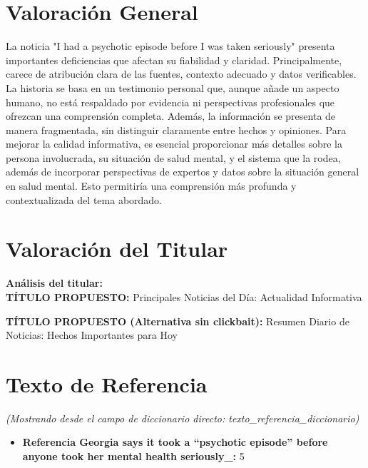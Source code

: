 \documentclass[10pt,a4paper]{article}
\begin{document}
\section*{Valoración General}
    La noticia "I had a psychotic episode before I was taken seriously" presenta importantes deficiencias que afectan su fiabilidad y claridad. Principalmente, carece de atribuci\'{o}n clara de las fuentes, contexto adecuado y datos verificables. La historia se basa en un testimonio personal que, aunque a\~{n}ade un aspecto humano, no est\'{a} respaldado por evidencia ni perspectivas profesionales que ofrezcan una comprensi\'{o}n completa. Adem\'{a}s, la informaci\'{o}n se presenta de manera fragmentada, sin distinguir claramente entre hechos y opiniones. Para mejorar la calidad informativa, es esencial proporcionar m\'{a}s detalles sobre la persona involucrada, su situaci\'{o}n de salud mental, y el sistema que la rodea, adem\'{a}s de incorporar perspectivas de expertos y datos sobre la situaci\'{o}n general en salud mental. Esto permitir\'{i}a una comprensi\'{o}n m\'{a}s profunda y contextualizada del tema abordado.
\vspace{1em}

\section*{Valoración del Titular}
        \textbf{Análisis del titular:} \\ 
        \textbf{T\'{I}TULO PROPUESTO:} Principales Noticias del D\'{i}a: Actualidad Informativa
\par\medskip
\textbf{T\'{I}TULO PROPUESTO (Alternativa sin clickbait):} Resumen Diario de Noticias: Hechos Importantes para Hoy
        \vspace{1em}
\vspace{1em}

\section*{Texto de Referencia}
    \textit{(Mostrando desde el campo de diccionario directo: texto\_referencia\_diccionario)}
    \begin{itemize}[leftmargin=*]
            \item \textbf{Referencia Georgia says it took a ``psychotic episode'' before anyone took her mental health seriously\_:} 5
    \end{itemize}
\vspace{1em}
\end{document}
